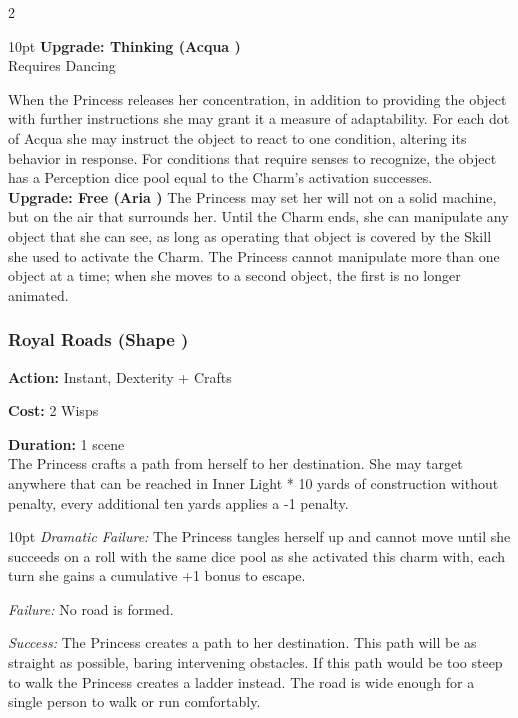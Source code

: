 \begin{multicols}{2}
\begin{myindentpar}{10pt}
\textbf{Upgrade: Thinking (Acqua \textbullet\textbullet)}\\

Requires Dancing

When the Princess releases her concentration, in addition to providing the object with further instructions she may grant it a measure of adaptability. For each dot of Acqua she may instruct the object to react to one condition, altering its behavior in response. For conditions that require senses to recognize, the object has a Perception dice pool equal to the Charm’s activation successes.\\

\textbf{Upgrade: Free (Aria \textbullet\textbullet)}
The Princess may set her will not on a solid machine, but on the air that surrounds her. Until the Charm ends, she can manipulate any object that she can see, as long as operating that object is covered by the Skill she used to activate the Charm. The Princess cannot manipulate more than one object at a time; when she moves to a second object, the first is no longer
animated.

\end{myindentpar}

\subsubsection*{Royal Roads (Shape \textbullet\textbullet)}
\noindent \textbf{Action:} Instant, Dexterity + Crafts

\noindent \textbf{Cost:} 2 Wisps

\noindent \textbf{Duration:} 1 scene\\

The Princess crafts a path from herself to her destination. She may target anywhere that can be reached in Inner Light * 10 yards of construction without penalty, every additional ten yards applies a -1 penalty.

\begin{myindentpar}{10pt} \emph{Dramatic Failure:} The Princess tangles herself up and cannot move until she succeeds on a roll with the same dice pool as she activated this charm with, each turn she gains a cumulative +1 bonus to escape.
 
\emph{Failure:} No road is formed.

\emph{Success:} The Princess creates a path to her destination. This path will be as straight as possible, baring intervening obstacles. If this path would be too steep to walk the Princess creates a ladder instead. The road is wide enough for a single person to walk or run comfortably.


\end{myindentpar}
\end{multicols}
